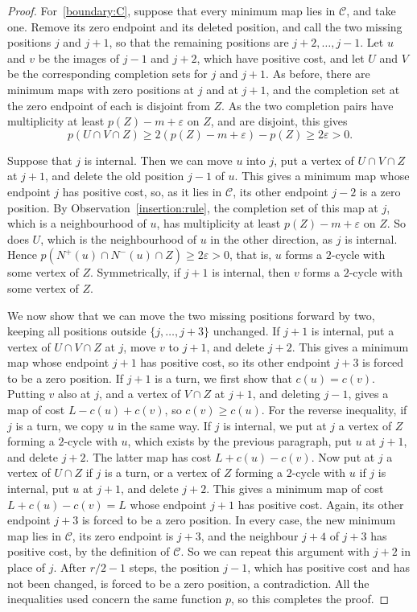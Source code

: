 \begin{proof}
For~\ref{boundary:C}, suppose that every minimum map lies in $\mathcal C$, and take one. Remove its zero endpoint and its deleted position, and call the two missing positions $j$ and $j+1$, so that the remaining positions are $j+2,\ldots,j-1$. Let $u$ and $v$ be the images of $j-1$ and $j+2$, which have positive cost, and let $U$ and $V$ be the corresponding completion sets for $j$ and $j+1$. As before, there are minimum maps with zero positions at $j$ and at $j+1$, and the completion set at the zero endpoint of each is disjoint from $Z$. As the two completion pairs have multiplicity at least $p(Z)-m+\varepsilon$ on $Z$, and are disjoint, this gives
\begin{equation}\label{boundary:UVZ}
 p(U\cap V\cap Z)\ge 2(p(Z)-m+\varepsilon)-p(Z)\ge 2\varepsilon>0.
\end{equation}

Suppose that $j$ is internal. Then we can move $u$ into $j$, put a vertex of $U\cap V\cap Z$ at $j+1$, and delete the old position $j-1$ of $u$. This gives a minimum map whose endpoint $j$ has positive cost, so, as it lies in $\mathcal C$, its other endpoint $j-2$ is a zero position. By Observation~\ref{insertion:rule}, the completion set of this map at $j$, which is a neighbourhood of $u$, has multiplicity at least $p(Z)-m+\varepsilon$ on $Z$. So does $U$, which is the neighbourhood of $u$ in the other direction, as $j$ is internal. Hence $p(N^+(u)\cap N^-(u)\cap Z)\ge2\varepsilon>0$, that is, $u$ forms a $2$-cycle with some vertex of $Z$. Symmetrically, if $j+1$ is internal, then $v$ forms a $2$-cycle with some vertex of $Z$.

We now show that we can move the two missing positions forward by two, keeping all positions outside $\{j,\ldots,j+3\}$ unchanged. If $j+1$ is internal, put a vertex of $U\cap V\cap Z$ at $j$, move $v$ to $j+1$, and delete $j+2$. This gives a minimum map whose endpoint $j+1$ has positive cost, so its other endpoint $j+3$ is forced to be a zero position.
If $j+1$ is a turn, we first show that $c(u)=c(v)$. Putting $v$ also at $j$, and a vertex of $V\cap Z$ at $j+1$, and deleting $j-1$, gives a map of cost $L-c(u)+c(v)$, so $c(v)\ge c(u)$. For the reverse inequality, if $j$ is a turn, we copy $u$ in the same way. If $j$ is internal, we put at $j$ a vertex of $Z$ forming a $2$-cycle with $u$, which exists by the previous paragraph, put $u$ at $j+1$, and delete $j+2$. The latter map has cost $L+c(u)-c(v)$.
Now put at $j$ a vertex of $U\cap Z$ if $j$ is a turn, or a vertex of $Z$ forming a $2$-cycle with $u$ if $j$ is internal, put $u$ at $j+1$, and delete $j+2$. This gives a minimum map of cost $L+c(u)-c(v)=L$ whose endpoint $j+1$ has positive cost. Again, its other endpoint $j+3$ is forced to be a zero position.
In every case, the new minimum map lies in $\mathcal C$, its zero endpoint is $j+3$, and the neighbour $j+4$ of $j+3$ has positive cost, by the definition of $\mathcal C$. So we can repeat this argument with $j+2$ in place of $j$.
After $r/2-1$ steps, the position $j-1$, which has positive cost and has not been changed, is forced to be a zero position, a contradiction. All the inequalities used concern the same function $p$, so this completes the proof.
\end{proof}

